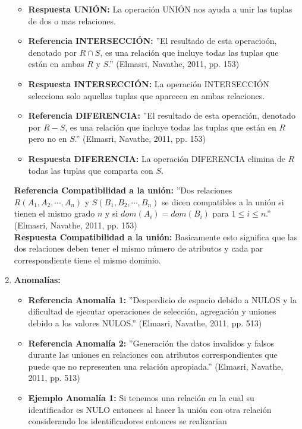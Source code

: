 \documentclass[twoside]{article}
\begin{document}
\begin{enumerate}
\begin{itemize}
                  \item \textbf{Respuesta UNI\'ON:} La operaci\'on UNI\'ON nos ayuda a unir las tuplas de dos o mas relaciones.
                  \item \textbf{Referencia INTERSECCI\'ON:} ''El resultado de esta operacio\'on, denotado por $R \cap S$, es una relaci\'on que incluye todas las tuplas
                        que est\'an en ambas $R$ y $S$.'' (Elmasri, Navathe, 2011, pp. 153)
                  \item \textbf{Respuesta INTERSECCI\'ON:} La operaci\'on INTERSECCI\'ON selecciona solo aquellas tuplas que aparecen en ambas relaciones.
                  \item \textbf{Referencia DIFERENCIA:} ''El resultado de esta operaci\'on, denotado por $R - S$, es una relaci\'on que incluye todas las tuplas que est\'an
                        en $R$ pero no en $S$.'' (Elmasri, Navathe, 2011, pp. 153)
                  \item \textbf{Respuesta DIFERENCIA:} La operaci\'on DIFERENCIA elimina de $R$ todas las tuplas que comparta con $S$.
            \end{itemize}
            \textbf{Referencia Compatibilidad a la uni\'on:} ''Dos relaciones $R(A_1, A_2, \cdots, A_n)$ y $S(B_1, B_2, \cdots, B_n)$ se dicen compatibles a la uni\'on si
            tienen el mismo grado $n$ y si $dom(A_i) = dom(B_i)$ para $1 \leq i \leq n$.'' (Elmasri, Navathe, 2011, pp. 153)\\
            \textbf{Respuesta Compatibilidad a la uni\'on:} Basicamente esto significa que las dos relaciones deben tener el mismo n\'umero de atributos y cada par correspondiente
            tiene el mismo dominio.
      \item
            \textbf{Anomal\'ias:}
            \begin{itemize}
                  \item \textbf{Referencia Anomal\'ia 1:} ''Desperdicio de espacio debido a NULOS y la dificultad de ejecutar operaciones de selecci\'on, agregaci\'on y uniones debido a los valores NULOS.''
                        (Elmasri, Navathe, 2011, pp. 513)
                  \item \textbf{Referencia Anomal\'ia 2:} ''Generaci\'on the datos invalidos y falsos durante las uniones en relaciones con atributos correspondientes que puede que no representen una relaci\'on apropiada.''
                        (Elmasri, Navathe, 2011, pp. 513)
                  \item \textbf{Ejemplo Anomal\'ia 1:} Si tenemos una relaci\'on en la cual su identificador es NULO entonces al hacer la uni\'on con otra relaci\'on considerando los identificadores entonces se realizarian

\end{itemize}
\end{enumerate}
\end{document}
